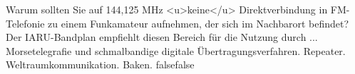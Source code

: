     {Warum sollten Sie auf 144,125 MHz <u>keine</u> Direktverbindung in FM-Telefonie zu einem Funkamateur aufnehmen, der sich im Nachbarort befindet? Der IARU-Bandplan empfiehlt diesen Bereich für die Nutzung durch ...}
    {Morsetelegrafie und schmalbandige digitale Übertragungsverfahren.}
    {Repeater.}
    {Weltraumkommunikation.}
    {Baken.}
    {false}{false}